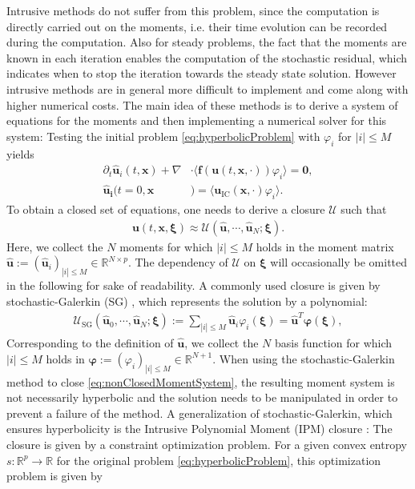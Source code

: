 Intrusive methods do not suffer from this problem, since the computation is directly carried out on the moments, i.e. their time evolution can be recorded during the computation. Also for steady problems, the fact that the moments are known in each iteration enables the computation of the stochastic residual, which indicates when to stop the iteration towards the steady state solution. However intrusive methods are in general more difficult to implement and come along with higher numerical costs. The main idea of these methods is to derive a system of equations for the moments and then implementing a numerical solver for this system: Testing the initial problem \eqref{eq:hyperbolicProblem} with $\varphi_i$ for $|i|\leq M$ yields
\begin{subequations}\label{eq:nonClosedMomentSystem}
\begin{align}
\partial_t \bm{\hat u}_i(t,\bm{x}) + \nabla&\cdot\langle\bm{f}(\bm{u}(t,\bm{x},\cdot)) \varphi_i\rangle = \bm{0}, \\
\bm{\hat u_i}(t=0,\bm{x}&) = \langle\bm{u}_{\text{IC}}(\bm{x},\cdot)\varphi_i\rangle.
\end{align}
\end{subequations}
To obtain a closed set of equations, one needs to derive a closure $\mathcal{U}$ such that 
\begin{align*}
\bm{u}(t,\bm x,\bm \xi) \approx \mathcal{U}(\bm{\hat u},\cdots,\bm{\hat u}_N;\bm\xi).
\end{align*}
Here, we collect the $N$ moments for which $\vert i \vert \leq M$ holds in the moment matrix $\bm{\hat{u}}:=(\bm{\hat{u}}_i)_{|i|\leq M}\in\mathbb{R}^{N \times p}$. The dependency of $\mathcal{U}$ on $\bm \xi$ will occasionally be omitted in the following for sake of readability. A commonly used closure is given by stochastic-Galerkin (SG) \cite{ghanem2003stochastic}, which represents the solution by a polynomial:
\begin{align*}
\mathcal{U}_{\text{SG}}(\bm{\hat u}_0,\cdots,\bm{\hat u}_N;\bm\xi):= \sum_{|i|\leq M} \bm{\hat{u}}_i\varphi_i(\bm{\xi}) = \hat{\bm u}^T\bm{\varphi}(\bm\xi),
\end{align*}
Corresponding to the definition of $\bm{\hat u}$, we collect the $N$ basis function for which $\vert i \vert \leq M$ holds in $\bm{\varphi}:=(\varphi_i)_{|i|\leq M}\in\mathbb{R}^{N+1}$. When using the stochastic-Galerkin method to close \eqref{eq:nonClosedMomentSystem}, the resulting moment system is not necessarily hyperbolic \cite{poette2009uncertainty} and the solution needs to be manipulated \cite{schlachter2018hyperbolicity} in order to prevent a failure of the method. A generalization of stochastic-Galerkin, which ensures hyperbolicity is the Intrusive Polynomial Moment (IPM) closure \cite{poette2009uncertainty}: The closure is given by a constraint optimization problem. For a given convex entropy $s:\mathbb{R}^p\to\mathbb{R}$ for the original problem \eqref{eq:hyperbolicProblem}, this optimization problem is given by
